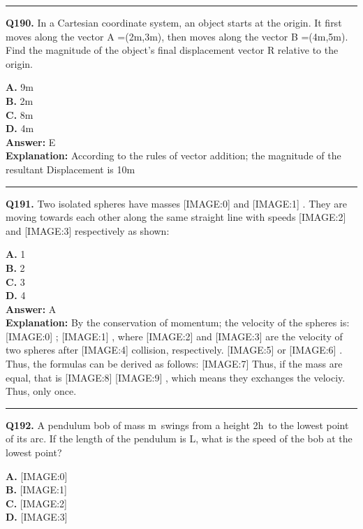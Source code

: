 \documentclass[12pt]{article}
\begin{document}
\hrule
\vspace{1em}


\noindent
\textbf{Q190.} In a Cartesian coordinate system, an object starts at the origin. It first moves along the vector
A
=(2m,3m), then moves along the vector
B
=(4m,5m). Find the magnitude of the object's final displacement vector
R
relative to the origin.



\textbf{A.} 9m \\
\textbf{B.} 2m \\
\textbf{C.} 8m \\
\textbf{D.} 4m \\

\textbf{Answer:} E \\
\textbf{Explanation:} According to the rules of vector addition; the magnitude of the resultant Displacement is 10m

\hrule
\vspace{1em}


\noindent
\textbf{Q191.} Two isolated spheres have masses
[IMAGE:0]
and
[IMAGE:1]
. They are moving towards each other along the same straight line with speeds
[IMAGE:2]
and
[IMAGE:3]
respectively as shown:



\textbf{A.} 1 \\
\textbf{B.} 2 \\
\textbf{C.} 3 \\
\textbf{D.} 4 \\

\textbf{Answer:} A \\
\textbf{Explanation:} By the conservation of momentum; the velocity of the spheres is:
[IMAGE:0]
;
[IMAGE:1]
, where
[IMAGE:2]
and
[IMAGE:3]
are the velocity of two spheres after
[IMAGE:4]
collision, respectively.
[IMAGE:5]
or
[IMAGE:6]
.
Thus, the formulas can be derived as follows:
[IMAGE:7]
Thus, if the mass are equal, that is
[IMAGE:8]
[IMAGE:9]
, which means they exchanges the velociy.
Thus, only once.

\hrule
\vspace{1em}


\noindent
\textbf{Q192.} A pendulum bob of mass m swings from a height 2h to the lowest point of its arc. If the length of the pendulum is L, what is the speed of the bob at the lowest point?



\textbf{A.} [IMAGE:0] \\
\textbf{B.} [IMAGE:1] \\
\textbf{C.} [IMAGE:2] \\
\textbf{D.} [IMAGE:3] \\
\end{document}
